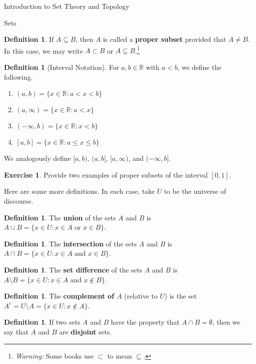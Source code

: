 \documentclass[11pt]{article}
\theoremstyle{definition}
\newtheorem{definition}[theorem]{Definition}
\newtheorem{exercise}[theorem]{Exercise}
\begin{document}
\begin{section}{Introduction to Set Theory and Topology}
\begin{subsection}{Sets}
\begin{definition}
If $A\subseteq B$, then $A$ is called a \textbf{proper subset} provided that $A\neq B$.  In this case, we may write $A\subset B$ or $A\subsetneq B$.\footnote{\emph{Warning:} Some books use $\subset$ to mean $\subseteq$.}
\end{definition}

\begin{definition}[Interval Notation]
For $a,b\in\mathbb{R}$ with $a<b$, we define the following.
\begin{enumerate}
\item $(a,b)=\{x\in\mathbb{R}:a<x<b\}$
\item $(a,\infty)=\{x\in\mathbb{R}:a<x\}$
\item $(-\infty,b)=\{x\in\mathbb{R}:x<b\}$
\item $[a,b]=\{x\in\mathbb{R}:a\leq x\leq b\}$
\end{enumerate}
We analogously define $[a,b)$, $(a,b]$, $[a,\infty)$, and $(-\infty,b]$.
\end{definition}

\begin{exercise}
Provide two examples of proper subsets of the interval $[0,1]$.
\end{exercise}

Here are some more definitions.  In each case, take $U$ to be the universe of discourse.

\begin{definition}
The \textbf{union} of the sets $A$ and $B$ is $A \cup B =\{x\in U : x\in A \mbox{ or } x\in B \}$.
\end{definition}

\begin{definition}
The \textbf{intersection} of the sets $A$ and $B$ is $A \cap B =\{x\in U : x\in A \mbox{ and } x\in B \}$.
\end{definition}

\begin{definition}
The \textbf{set difference} of the sets $A$ and $B$ is $A \setminus B =\{x\in U : x\in A \mbox{ and } x\notin B \}$.
\end{definition}

\begin{definition}
The \textbf{complement of $A$} (relative to $U$) is the set $A^c=U \setminus A =\{x \in U : x \notin A\}$.
\end{definition}

\begin{definition}
If two sets $A$ and $B$ have the property that $A \cap B = \emptyset$, then we say that $A$ and $B$ are \textbf{disjoint} sets.
\end{definition}


\end{subsection}
\end{section}
\end{document}

